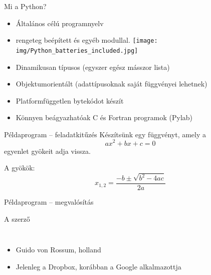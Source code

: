 \begin{frame}
  {Mi a Python?}
  \begin{itemize}
    \item <+-| alert@+> Általános célú programnyelv
    \item <+-| alert@+> rengeteg beépített és egyéb modullal.
\texttt{[image: img/Python\_batteries\_included.jpg]}
    \item <+-| alert@+> Dinamikusan típusos (egyszer egész másszor
        lista)
    \item <+-| alert@+> Objektumorientált (adattípusoknak saját
        függvényei lehetnek)
    \item <+-| alert@+> Platformfüggetlen bytekódot készít
    \item <+-| alert@+> Könnyen beágyazhatóak C és Fortran programok
        (Pylab)
  \end{itemize}
\end{frame}

\begin{frame}
  {Példaprogram -- feladatkitűzés}
  Készítsünk egy függvényt, amely a
  \[ax^2+bx+c=0\]
  egyenlet gyökeit adja vissza.

  A gyökök:
  \[x_{1,2}= \frac {-b \pm \sqrt{b^2 - 4ac}} {2a}\]
\end{frame}

\begin{frame}
  {Példaprogram -- megvalósítás}
  \small
  
\end{frame}

\begin{frame}
  {A szerző}
  \begin{columns}[t, onlytextwidth]
  \begin{itemize}
    \item <+-| alert@+> Guido von Rossum, holland
    \item <+-| alert@+> Jelenleg a Dropbox, korábban a Google alkalmazottja
  \end{itemize}
  \end{columns}
\end{frame}

